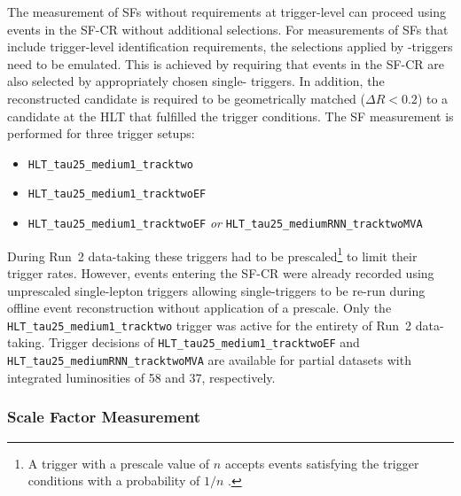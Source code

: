 The measurement of SFs without requirements at trigger-level can proceed using
events in the SF-CR without additional selections. For measurements of SFs that
include trigger-level identification requirements, the selections applied by
\tauhadvis-triggers need to be emulated. This is achieved by requiring that
events in the SF-CR are also selected by appropriately chosen single-\tauhadvis
triggers. In addition, the reconstructed \tauhadvis candidate is required to be
geometrically matched ($\Delta R < 0.2$) to a \tauhadvis candidate at the HLT
that fulfilled the trigger conditions. The SF measurement is performed for three
trigger setups:
\begin{itemize}
\item \verb|HLT_tau25_medium1_tracktwo| %
\item \verb|HLT_tau25_medium1_tracktwoEF| %
\item \verb|HLT_tau25_medium1_tracktwoEF| \emph{or}
  \verb|HLT_tau25_mediumRNN_tracktwoMVA| %
\end{itemize}
During Run~2 data-taking these triggers had to be prescaled\footnote{A trigger
  with a prescale value of $n$ accepts events satisfying the trigger conditions
  with a probability of $1 / n$ \cite{TRIG-2019-04}.} to limit their trigger
rates. However, events entering the SF-CR were already recorded using
unprescaled single-lepton triggers allowing single-\tauhadvis triggers to be
re-run during offline event reconstruction without application of a prescale.
Only the \verb|HLT_tau25_medium1_tracktwo| trigger was active for the entirety
of Run~2 data-taking. Trigger decisions of \verb|HLT_tau25_medium1_tracktwoEF|
and \verb|HLT_tau25_mediumRNN_tracktwoMVA| are available for partial datasets
with integrated luminosities of \SI{58}{\ifb} and \SI{37}{\ifb}, respectively.


\subsubsection{Scale Factor Measurement}

